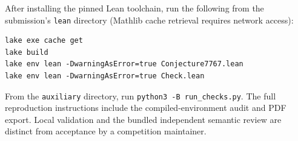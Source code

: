 \documentclass[11pt]{article}
\begin{document}
After installing the pinned Lean toolchain, run the following from the
submission's \texttt{lean} directory (Mathlib cache retrieval requires
network access):
\begin{verbatim}
lake exe cache get
lake build
lake env lean -DwarningAsError=true Conjecture7767.lean
lake env lean -DwarningAsError=true Check.lean
\end{verbatim}
From the \texttt{auxiliary} directory, run \texttt{python3 -B run\_checks.py}.
The full reproduction instructions include the compiled-environment audit
and PDF export. Local validation and the bundled independent semantic review
are distinct from acceptance by a competition maintainer.
\end{document}
